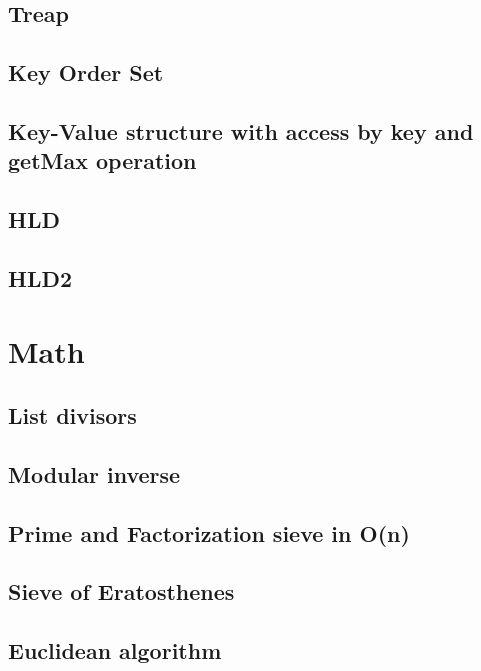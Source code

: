 \documentclass[a4paper]{article}
\begin{document}
\begin{multicols*}{2}
    \subsection{Treap}
        
    \subsection{Key Order Set}
        
    \subsection{Key-Value structure with access by key and getMax operation}
        
    \subsection{HLD}
        
    \subsection{HLD2}
            

\section{Math}
    \subsection{List divisors}
        
    \subsection{Modular inverse}
        
    \subsection{Prime and Factorization sieve in O(n)}
        
    \subsection{Sieve of Eratosthenes}
        
    \subsection{Euclidean algorithm}

\end{multicols*}
\end{document}
